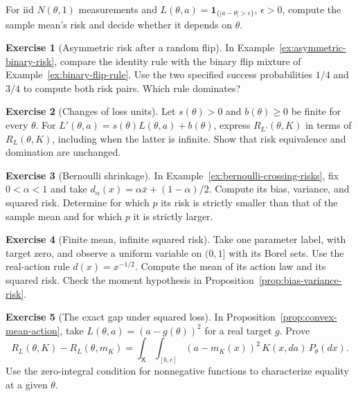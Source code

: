 \documentclass[11pt,oneside]{book}
\theoremstyle{definition}
\newtheorem{exercise}{Exercise}[section]
\theoremstyle{remark}
\begin{document}
\begin{practiceexercise}
\label{wex:tolerance-loss-normal-mean}
For iid $N(\theta,1)$ measurements and
$L(\theta,a)=\mathbf1_{\{|a-\theta|>\epsilon\}}$, $\epsilon>0$, compute the
sample mean's risk and decide whether it depends on $\theta$.
\end{practiceexercise}

\begin{exercise}[Asymmetric risk after a random flip]
\label{exer:binary-flip-risk}
In Example~\ref{ex:asymmetric-binary-risk}, compare the identity rule
with the binary flip mixture of Example~\ref{ex:binary-flip-rule}.
Use the two specified success probabilities $1/4$ and $3/4$ to compute
both risk pairs. Which rule dominates?
\end{exercise}

\begin{exercise}[Changes of loss units]
\label{exer:risk-comparison-rescaling}
Let $s(\theta)>0$ and $b(\theta)\geq0$ be finite for every $\theta$.
For $L'(\theta,a)=s(\theta)L(\theta,a)+b(\theta)$, express
$R_{L'}(\theta,K)$ in terms of $R_L(\theta,K)$, including when the latter
is infinite. Show that risk equivalence and domination are unchanged.
\end{exercise}

\begin{exercise}[Bernoulli shrinkage]
\label{exer:bernoulli-shrinkage-risk}
In Example~\ref{ex:bernoulli-crossing-risks}, fix $0<\alpha<1$ and take
$d_\alpha(x)=\alpha\bar x+(1-\alpha)/2$. Compute its bias, variance,
and squared risk. Determine for which $p$ its risk is strictly smaller
than that of the sample mean and for which $p$ it is strictly larger.
\end{exercise}

\begin{exercise}[Finite mean, infinite squared risk]
\label{exer:infinite-squared-risk}
Take one parameter label, with target zero, and observe a uniform variable
on $(0,1]$ with its Borel sets. Use the real-action rule $d(x)=x^{-1/2}$.
Compute the mean of its action law and its squared risk. Check the moment
hypothesis in Proposition~\ref{prop:bias-variance-risk}.
\end{exercise}

\begin{exercise}[The exact gap under squared loss]
\label{exer:mean-action-risk-gap}
In Proposition~\ref{prop:convex-mean-action}, take
$L(\theta,a)=(a-g(\theta))^2$ for a real target $g$. Prove
\[
R_L(\theta,K)-R_L(\theta,m_K)
=\int_{\mathsf X}\int_{[b,c]}(a-m_K(x))^2\,K(x,da)\,P_\theta(dx).
\]
Use the zero-integral condition for nonnegative functions to characterize
equality at a given $\theta$.
\end{exercise}
\end{document}
